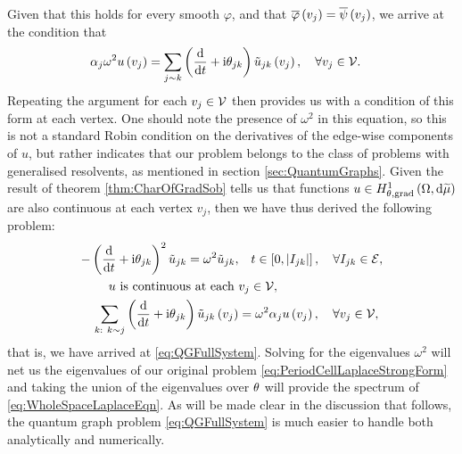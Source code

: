 Given that this holds for every smooth $\varphi$, and that $\overline{\varphi}\left( v_j \right)=\overline{\psi}\left( v_j \right)$, we arrive at the condition that
\begin{align*}
	\alpha_j\omega^2 u\left( v_j \right) &= \sum_{j\sim k}\left( \dfrac{\mathrm{d}}{\mathrm{d}t} + \mathrm{i}\theta_{jk} \right)\tilde{u}_{jk}\left( v_j \right), \quad \forall v_j \in \mathcal{V}.
\end{align*}
Repeating the argument for each $v_j\in \mathcal{V}$ then provides us with a condition of this form at each vertex.
One should note the presence of $\omega^2$ in this equation, so this is not a standard Robin condition on the derivatives of the edge-wise components of $u$, but rather indicates that our problem belongs to the class of problems with generalised resolvents, as mentioned in section \ref{sec:QuantumGraphs}.
Given the result of theorem \ref{thm:CharOfGradSob} tells us that functions $u\in H^1_{\theta, \mathrm{grad}}\left( \Omega, \mathrm{d}\widetilde{\mu} \right)$ are also continuous at each vertex $v_j$, then we have thus derived the following problem:
\begin{align*}
	-\left( \dfrac{\mathrm{d}}{\mathrm{d}t} + \mathrm{i}\theta_{jk} \right)^2 \tilde{u}_{jk} = \omega^2 \tilde{u}_{jk}, &\quad t\in\left[ 0,\left\lvert I_{jk} \right\rvert \right], \quad \forall I_{jk}\in \mathcal{E}, \\
	u \text{ is continuous at each } &v_j \in \mathcal{V}, \\
	\sum_{k: \ k\sim j}\left( \dfrac{\mathrm{d}}{\mathrm{d}t} + \mathrm{i}\theta_{jk} \right)\tilde{u}_{jk}\left( v_j \right) &= \omega^2\alpha_{j}u\left( v_j \right),  \quad \forall v_j \in \mathcal{V},
\end{align*}
that is, we have arrived at \eqref{eq:QGFullSystem}.
Solving for the eigenvalues $\omega^2$ will net us the eigenvalues of our original problem \eqref{eq:PeriodCellLaplaceStrongForm} and taking the union of the eigenvalues over $\theta$ will provide the spectrum of \eqref{eq:WholeSpaceLaplaceEqn}.
As will be made clear in the discussion that follows, the quantum graph problem \eqref{eq:QGFullSystem} is much easier to handle both analytically and numerically.